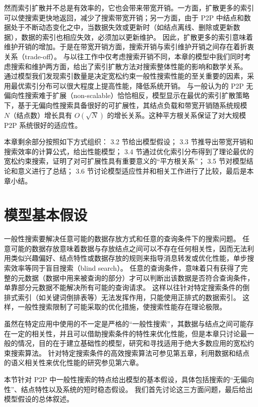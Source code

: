 \documentclass{thuthesis}
\begin{document}
然而索引扩散并不总是有效率的，它也会带来带宽开销。一方面，扩散更多的索引可以使搜索更快地返回，减少了搜索带宽开销；另一方面，由于 P2P 中结点和数据处于不断动态变化之中，当数据失效或更新时（如结点离线、删除或更新数据），数据的索引也相应失效，必须加以更新维护。
因此，扩散更多的索引意味着维护开销的增加。于是在带宽开销方面，搜索开销与索引维护开销之间存在着折衷关系（trade-off）。
与以往工作中仅考虑搜索开销不同，本章的模型中我们同时考虑搜索和维护两方面，给出了索引扩散方法对搜索整体性能的影响和数学关系。
通过模型我们发现索引数量是决定宽松约束一般性搜索性能的至关重要的因素，采用最优索引分布可以很大程度上提高性能，降低系统开销。
与一般认为的 P2P 无偏向性搜索难于扩展（non-scalable）恰恰相反，模型显示在最优的索引扩散策略下，基于无偏向性搜索具备很好的可扩展性，其结点负载和带宽开销随系统规模 $N$（结点数）增长具有 $O(\sqrt{N})$ 的增长关系。这种平方根关系保证了对大规模 P2P 系统很好的适应性。

本章剩余部分按照如下方式组织：
3.2 节给出模型假设；
3.3 节推导出带宽开销和搜索效率的计算公式，给出性能模型；
3.4 节通过优化索引分布得到了理论最优的宽松约束搜索，证明了对可扩展性具有重要意义的“平方根关系”；
3.5 节对模型结论和意义进行了总结；
3.6 节讨论模型适应性并和相关工作进行了比较，最后是本章小结。


\section{模型基本假设}

一般性搜索要解决任意可能的数据存放方式和任意的查询条件下的搜索问题。
任意可能的数据存放意味着数据与存放结点之间可以不存在任何相关性，因而无法利用类似兴趣偏好、结点特性或数据存放的规则来指导消息转发或优化性能，单步搜索效率等同于盲目搜索（blind search）。
任意的查询条件，意味着只有获得了完整的元数据（数据中用来被查询的部分）才可以判断出该数据是否符合查询条件，单靠部分元数据不能解决所有可能的查询请求。
这样以往针对特定搜索条件的倒排式索引（如关键词倒排表等）无法发挥作用，只能使用正排式的数据索引。
这样，一般性搜索限制了可能采取的优化措施，使搜索性能存在理论极限。

虽然在特定应用中使用的不一定是严格的“一般性搜索”，其数据与结点之间可能存在一定的相关性，并且可以借助搜索条件的特性来优化性能，但是本章只讨论最一般的情况，目的在于建立基础性的模型，研究和寻找适用于绝大多数应用的宽松约束搜索算法。
针对特定搜索条件的高效搜索算法可参见第五章，利用数据和结点的语义相关性来优化性能的研究参见第六章。

本节针对 P2P 中一般性搜索的特点给出模型的基本假设，具体包括搜索的“无偏向性”、结点特性以及系统的短时稳态假设。
我们首先讨论这三方面问题，最后给出模型假设的总体叙述。
\end{document}
